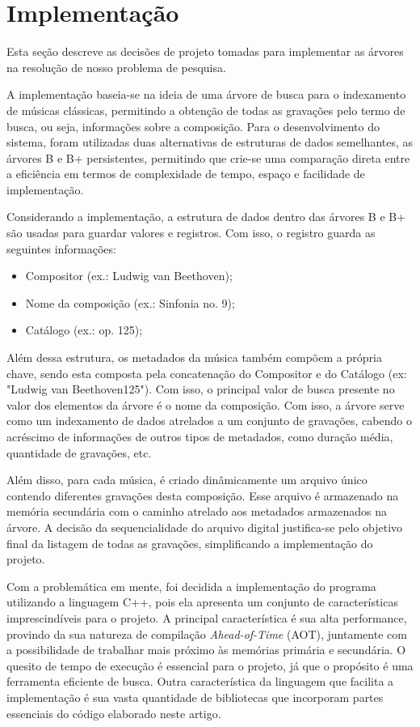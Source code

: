 \documentclass[12pt]{article}
\begin{document}
\section{Implementação} \label{sec:implementation}
Esta seção descreve as decisões de projeto tomadas para implementar as árvores
na resolução de nosso problema de pesquisa.

A implementação baseia-se na ideia de uma árvore de busca para o indexamento de
músicas clássicas, permitindo a obtenção de todas as gravações pelo termo de
busca, ou seja, informações sobre a composição. Para o desenvolvimento do sistema, foram
utilizadas duas alternativas de estruturas de dados semelhantes, as árvores B e
B\nolinebreak+ persistentes, permitindo que crie-se uma comparação direta entre
a eficiência em termos de complexidade de tempo, espaço e facilidade de
implementação.

Considerando a implementação, a estrutura de dados dentro das árvores B e
B\nolinebreak+ são usadas para guardar valores e registros. Com isso, o registro
guarda as seguintes informações:
\begin{itemize}
  \item Compositor (ex.: Ludwig van Beethoven);
  \item Nome da composição (ex.: Sinfonia no. 9);
  \item Catálogo (ex.: op. 125);
\end{itemize}

Além dessa estrutura, os metadados da música também compõem a própria chave,
sendo esta composta pela concatenação do Compositor e do Catálogo (ex:
"Ludwig van Beethoven125"). Com isso, o principal valor de busca presente no
valor dos elementos da árvore é o nome da composição. Com isso, a árvore serve
como um indexamento de dados atrelados a um conjunto de gravações, cabendo o
acréscimo de informações de outros tipos de metadados, como duração média,
quantidade de gravações, etc.

Além disso, para cada música, é criado dinâmicamente um arquivo único contendo diferentes gravações 
desta composição. Esse arquivo é armazenado na memória secundária com o caminho
atrelado aos metadados armazenados na árvore. A decisão da sequencialidade do
arquivo digital justifica-se pelo objetivo final da listagem de todas as
gravações, simplificando a implementação do projeto.

Com a problemática em mente, foi decidida a implementação do programa utilizando
a linguagem C++, pois ela apresenta um conjunto de características
imprescindíveis para o projeto. A principal característica é sua alta
performance, provindo da sua natureza de compilação \emph{Ahead-of-Time} (AOT),
juntamente com a possibilidade de trabalhar mais próximo às memórias primária e
secundária.
O quesito de tempo de execução é essencial para o projeto, já que o propósito é
uma ferramenta eficiente de busca.
Outra característica da linguagem que facilita a implementação é sua vasta
quantidade de bibliotecas que incorporam partes essenciais do código elaborado neste artigo.
\end{document}
